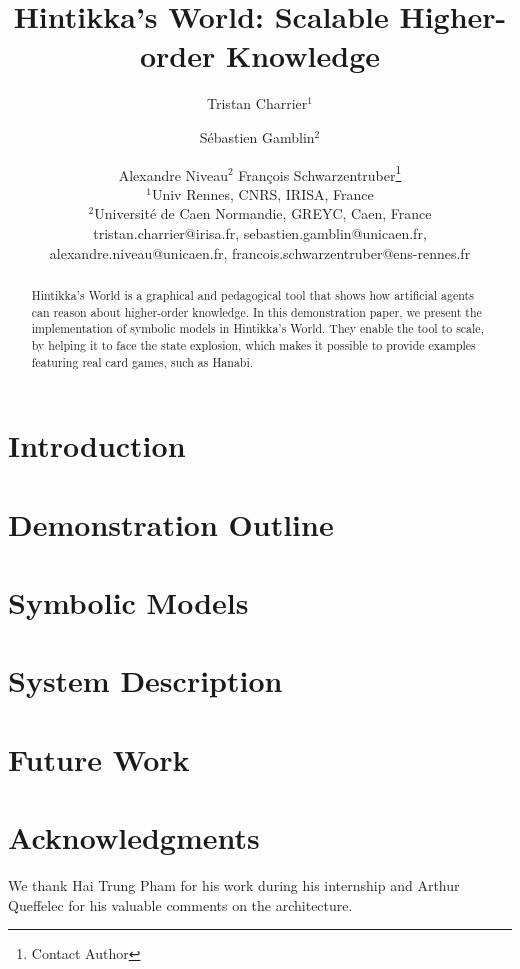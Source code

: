 \documentclass{article}
\title{Hintikka's World: Scalable Higher-order Knowledge}
\author{
Tristan Charrier$^1$\and
Sébastien Gamblin$^2$\and
Alexandre Niveau$^{2}$\And
François Schwarzentruber\footnote{Contact Author}\\
\affiliations
$^1$Univ Rennes, CNRS, IRISA, France\\
$^2$Université de Caen Normandie, GREYC, Caen, France\\
\emails
tristan.charrier@irisa.fr, 
sebastien.gamblin@unicaen.fr,
alexandre.niveau@unicaen.fr,
francois.schwarzentruber@ens-rennes.fr
}
\begin{document}
\newcommand{\mettel}{\textsf{MetTeL2}\xspace}
\newcommand{\citet}[1]{\citeauthor{#1}~\shortcite{#1}}

\maketitle

\begin{abstract}
Hintikka's World is a graphical and pedagogical tool that shows how artificial agents can reason about higher-order knowledge. In this demonstration paper, we present the implementation of symbolic models in Hintikka's World. They enable the tool to scale, by helping it to face the state explosion, which makes it possible to provide examples featuring real card games, such as Hanabi.
\end{abstract}



\section{Introduction}


\section{Demonstration Outline}
\label{section:demonstration}



\section{Symbolic Models}
\label{section:symbolicmodels}








\section{System Description}
\label{section:architecture}


\section{Future Work}
\label{section:perspectives}


\vfill

\section*{Acknowledgments}

We thank Hai Trung Pham for his work during his internship and Arthur Queffelec for his valuable comments on the architecture.








\newpage





\end{document}
